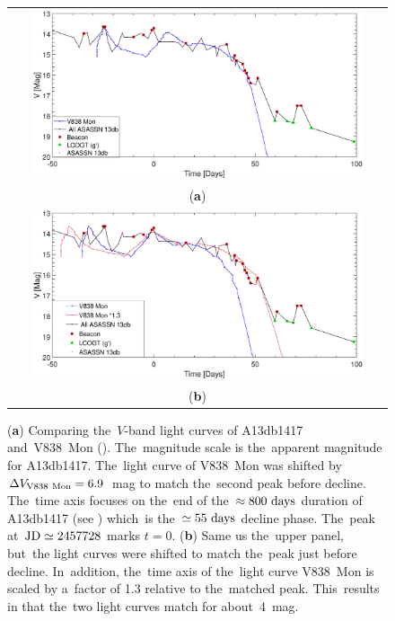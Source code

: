 \documentclass[galaxies,article,accept,moreauthors,pdftex]{mdpi}
\def \days{~\rm{days}}
\begin{document}
\begin{figure}[t]
\centering
\begin{tabular}{c}
\includegraphics[trim= 0.9cm 1.5cm 1.0cm 0.8cm,clip=true,width=0.9\textwidth]{All11.eps}\\
(\textbf{a}) \\ %
\includegraphics[trim= 0.9cm 0.0cm 1.0cm 0.8cm,clip=true,width=0.9\textwidth]{ALL10.eps}\\
(\textbf{b}) \\
\end{tabular}
\caption{\textls[-15](\textbf{a}) Comparing the~$V$-band light curves of A13db1417~\citep{SiciliaAguilaretal2017} and~V838~Mon (\cite{Bondetal2003, Starrfieldetal2005,Sparksetal2008}). The~magnitude scale is the~apparent magnitude for A13db1417. The~light curve of V838~Mon was shifted by $\Delta V_{\rm V838~Mon} =6.9$~mag to match the~second peak before decline. The~time axis  focuses on the~end of the~$\approx 800 \days$ duration of A13db1417 (see \cite{SiciliaAguilaretal2017}) which~is the~$\simeq 55 \days$ decline phase. The~peak at~$\rm{JD} \simeq 2457728$ marks $t=0$. (\textbf{b}) Same us the~upper panel, but~the light curves were shifted to match the~peak just before decline. In~addition, the~time axis of the~light curve V838~Mon is scaled by a~factor of 1.3 relative to the~matched peak. This~results in that the~two light curves match for about~4~mag. %
}
\label{fig:v838_VS_13db}
\end{figure}
\end{document}
